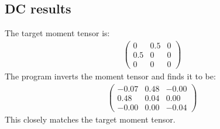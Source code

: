 \documentclass{article}
\begin{document}
\subsection*{DC results}
The target moment tensor is:
\begin{gather}
	\begin{pmatrix}
	0 & 0.5 & 0 \\
	0.5 & 0 & 0 \\
	0 & 0 & 0 
	\end{pmatrix}
\end{gather}
The program inverts the moment tensor and finds it to be:
\begin{gather}
	\begin{pmatrix}
	-0.07 & 0.48 & -0.00 \\
	0.48 & 0.04 & 0.00 \\
	-0.00 & 0.00 & -0.04 
	\end{pmatrix}
\end{gather}
This closely matches the target moment tensor.
\end{document}

